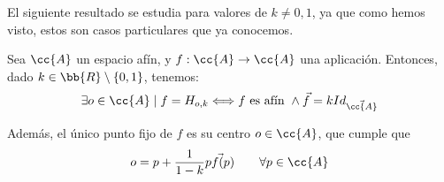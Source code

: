El siguiente resultado se estudia para valores de $k\neq 0,1$, ya que como hemos visto, estos son casos particulares que ya conocemos.
\begin{prop}
    Sea $\cc{A}$ un espacio afín, y $f:\cc{A}\to \cc{A}$ una aplicación. Entonces, dado $k\in \bb{R}\setminus \{0,1\}$, tenemos:
    \begin{equation*}
        \exists o\in \cc{A}\mid f=H_{o,k} \Longleftrightarrow f\text{ es afín }\land \vec{f}=kId_{\vec{\cc{A}}} 
    \end{equation*}

    Además, el único punto fijo de $f$ es su centro $o\in \cc{A}$, que cumple que
    \begin{equation*}
        o = p+\frac{1}{1-k}\vec{pf(p)} \qquad \forall p\in \cc{A}
    \end{equation*}
\end{prop}
